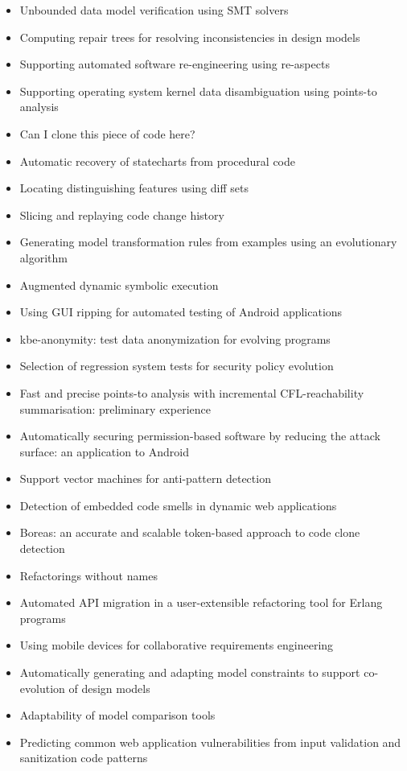 {\begin{itemize}[itemsep=-1ex]
  \item Unbounded data model verification using SMT solvers
  \item Computing repair trees for resolving inconsistencies in design models
  \item Supporting automated software re-engineering using re-aspects
  \item Supporting operating system kernel data disambiguation using points-to analysis
  \item Can I clone this piece of code here?
  \item Automatic recovery of statecharts from procedural code
  \item Locating distinguishing features using diff sets
  \item Slicing and replaying code change history
  \item Generating model transformation rules from examples using an evolutionary algorithm
  \item Augmented dynamic symbolic execution
  \item Using GUI ripping for automated testing of Android applications
  \item kbe-anonymity: test data anonymization for evolving programs
  \item Selection of regression system tests for security policy evolution
  \item Fast and precise points-to analysis with incremental CFL-reachability summarisation: preliminary experience
  \item Automatically securing permission-based software by reducing the attack surface: an application to Android
  \item Support vector machines for anti-pattern detection
  \item Detection of embedded code smells in dynamic web applications
  \item Boreas: an accurate and scalable token-based approach to code clone detection
  \item Refactorings without names
  \item Automated API migration in a user-extensible refactoring tool for Erlang programs
  \item Using mobile devices for collaborative requirements engineering
  \item Automatically generating and adapting model constraints to support co-evolution of design models
  \item Adaptability of model comparison tools
  \item Predicting common web application vulnerabilities from input validation and sanitization code patterns

\end{itemize}}
